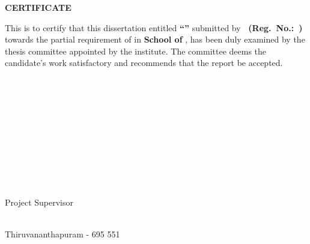 \begin{center}
{\Large{\bf{CERTIFICATE}}}
\end{center}


\noindent
This is to certify that this dissertation entitled {\bf ``\ThesisTitle''}  submitted by {\bf\ThesisAuthor\ (Reg.\ No.:\ \RegNumber)} towards the partial requirement of {\bf \DegreeDisplay} in {\bf School of \Department}, has been duly examined by the thesis committee appointed by the institute. The committee deems the candidate's work satisfactory and recommends that the report be accepted.

\vspace{3.5cm}

\noindent
\begin{minipage}[l]{0.3\textwidth}
\centering
\fillin[0.9\linewidth]\\
{\large \bf \ThesisCommitteeMemberA} \medskip\\
{\large \TCMAFacultyPosition}
\end{minipage}
\hfill
\begin{minipage}[c]{0.3\textwidth}
\centering
\fillin[0.9\linewidth]\\
{\large \bf \ThesisCommitteeMemberB} \medskip\\
{\large \TCMBFacultyPosition}
\end{minipage}
\hfill
\begin{minipage}[r]{0.3\textwidth}
\centering
\fillin[0.9\linewidth]\\
{\large \bf \ThesisCommitteeMemberC} \medskip\\
{\large \TCMCFacultyPosition}
\end{minipage}

\vspace{4cm}

\begin{flushright}
    \begin{minipage}[c]{0.4\textwidth}
    \centering
    \fillin[0.9\linewidth]\\
    {\large \bf \ProjectSupervisor} \medskip\\
    {\large Project Supervisor}
    \end{minipage}
\end{flushright}
\vfill
\noindent\SubmissionDate \\
Thiruvananthapuram - 695 551
\vspace{1.5cm}
\clearpage
